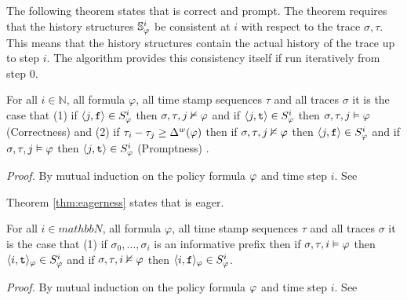 The following theorem states that \monitor is correct and prompt. The theorem requires that the history structures $\mathbb{S}^{i}_{\varphi}$ be consistent at $i$ with respect to the trace $\sigma,\tau$. This means that the history structures contain the actual history of the trace up to step $i$. The algorithm provides this consistency itself if run iteratively from step $0$.

\begin{theorem}
For all $i \in \mathbb{N}$, all formula $\varphi$, all time stamp sequences $\tau$ and all traces $\sigma$ it is the case that (1) if $\langle j, \mathrm{\texttt{f}} \rangle \in {S}^{i}_{\varphi}$ then $\sigma, \tau, j \nvDash \varphi$ and if $\langle j, \mathrm{\texttt{t}} \rangle \in {S}^{i}_{\varphi}$ then $\sigma, \tau, j \vDash \varphi$ (Correctness) and (2) if $\tau_i - \tau_j \geq \Delta^w(\varphi)$ then if $\sigma, \tau, j \nvDash \varphi$ then $\langle j, \mathrm{\texttt{f}} \rangle \in {S}^{i}_{\varphi}$ and if $\sigma, \tau, j \vDash \varphi$ then $\langle j, \mathrm{\texttt{t}} \rangle \in {S}^{i}_{\varphi}$ (Promptness)
.
\end{theorem}
\textit{Proof.} By mutual induction on the policy formula $\varphi$ and time step $i$. See \cite{TechPaper}

Theorem \ref{thm:eagerness} states that \monitor is eager. 

\begin{theorem}
For all $i \in mathbb{N}$, all formula $\varphi$, all time stamp sequences $\tau$ and all traces $\sigma$ it is the case that (1) if $\sigma_0,\ldots,\sigma_i$ is an informative prefix then if $\sigma,\tau, i \vDash \varphi$ then $\langle i, \mathrm{\texttt{t}} \rangle_{\varphi} \in {S}^{i}_{\varphi}$ and if $\sigma, \tau, i \nvDash \varphi$ then $\langle i, \mathrm{\texttt{f}} \rangle_{\varphi} \in {S}^{i}_{\varphi}$. 
\end{theorem}
\textit{Proof.} By mutual induction on the policy formula $\varphi$ and time step $i$. See \cite{TechPaper}
